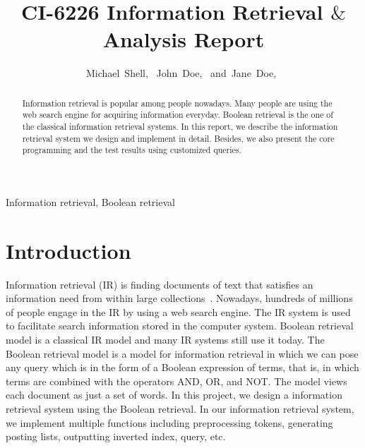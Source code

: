 \documentclass[journal]{IEEEtran}
\begin{document}
\title{CI-6226 Information Retrieval $\&$ Analysis Report}


\author{Michael~Shell,~
        John~Doe,~
        and~Jane~Doe,~
}

\maketitle

\begin{abstract}
Information retrieval is popular among people nowadays. Many people are using the web search engine for acquiring information everyday. Boolean retrieval is the one of the classical information retrieval systems. In this report, we describe the information retrieval system we design and implement in detail. Besides, we also present the core programming and the test results using customized queries.
\end{abstract}

\begin{IEEEkeywords}
Information retrieval, Boolean retrieval
\end{IEEEkeywords}


\IEEEpeerreviewmaketitle



\section{Introduction}
Information retrieval (IR) is finding documents of text that satisfies an information need from within large collections~\cite{manning2010introduction}. Nowadays, hundreds of millions of people engage in the IR by using a web search engine. The IR system is used to facilitate search information stored in the computer system.
Boolean retrieval model is a classical IR model and many IR systems still use it today. The Boolean retrieval model is a model for information retrieval in which we can pose any query which is in the form of a Boolean expression of terms, that is, in which terms are combined with the operators AND, OR, and NOT. The model views each document as just a set of words. In this project, we design a information retrieval system using the Boolean retrieval. In our information retrieval system, we implement multiple functions including preprocessing tokens, generating posting lists, outputting inverted index, query, etc. 
\end{document}

